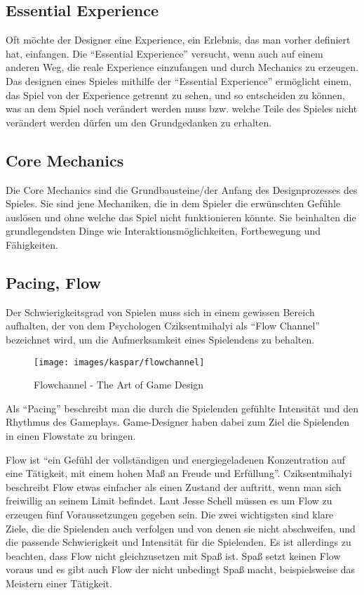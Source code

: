 \subsection{Essential Experience}

Oft möchte der Designer eine Experience, ein Erlebnis, das man vorher definiert hat, einfangen. Die "`Essential Experience"' versucht, wenn auch auf einem anderen Weg, die reale Experience einzufangen und durch Mechanics zu erzeugen. Das designen eines Spieles mithilfe der "`Essential Experience"' ermöglicht einem, das Spiel von der Experience getrennt zu sehen, und so entscheiden zu können, was an dem Spiel noch verändert werden muss bzw. welche Teile des Spieles nicht verändert werden dürfen um den Grundgedanken zu erhalten\cite[S.55]{_art_of_gamedesign}.

\subsection{Core Mechanics}

Die Core Mechanics sind die Grundbausteine/der Anfang des Designprozesses des Spieles. Sie sind jene Mechaniken, die in dem Spieler die erwünschten Gefühle auslösen und ohne welche das Spiel nicht funktionieren könnte. Sie beinhalten die grundlegendsten Dinge wie Interaktionsmöglichkeiten, Fortbewegung und Fähigkeiten.

\subsection{Pacing, Flow\label{_flow}}

Der Schwierigkeitsgrad von Spielen muss sich in einem gewissen Bereich aufhalten, der von dem Psychologen Cziksentmihalyi als "`Flow Channel"' bezeichnet wird, um die Aufmerksamkeit eines Spielendens zu behalten\cite[S.205]{_art_of_gamedesign}.

\begin{figure}[H]
	\centering
	\texttt{[image: images/kaspar/flowchannel]}
	\caption{Flowchannel - The Art of Game Design\cite{_art_of_gamedesign}}
\end{figure}

Als "`Pacing"' beschreibt man die durch die Spielenden gefühlte Intensität und den Rhythmus des Gameplays\cite{_the_level_design_book}. Game-Designer haben dabei zum Ziel die Spielenden in einen Flowstate zu bringen.

Flow ist "`ein Gefühl der vollständigen und energiegeladenen Konzentration auf eine Tätigkeit, mit einem hohen Maß an Freude und Erfüllung"'\cite[S.204]{_art_of_gamedesign}.
Cziksentmihalyi beschreibt Flow etwas einfacher als einen Zustand der auftritt, wenn man sich freiwillig an seinem Limit befindet\cite{_flow}.
Laut Jesse Schell müssen es um Flow zu erzeugen fünf Voraussetzungen gegeben sein\cite[S.211]{_art_of_gamedesign}. Die zwei wichtigsten sind klare Ziele, die die Spielenden auch verfolgen und von denen sie nicht abschweifen, und die passende Schwierigkeit und Intensität für die Spielenden. Es ist allerdings zu beachten, dass Flow nicht gleichzusetzen mit Spaß ist. Spaß setzt keinen Flow voraus und es gibt auch Flow der nicht unbedingt Spaß macht, beispielsweise das Meistern einer Tätigkeit\cite[S.75]{_theory_of_fun}.

